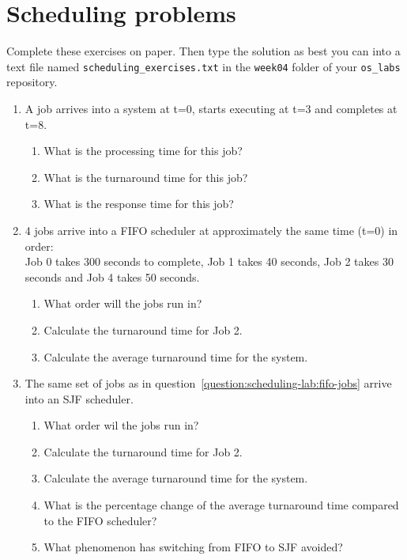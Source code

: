 \chapter{Scheduling problems}
\label{ch:scheduling-problems}

Complete these exercises on paper.
Then type the solution as best you can into a text file named \texttt{scheduling\_exercises.txt} in the \texttt{week04} folder of your \texttt{os\_labs} repository.

\begin{enumerate}

\item 
  A job arrives into a system at t=0, starts executing at t=3 and completes at t=8.
  \begin{enumerate}
  \item What is the processing time for this job?
  \item What is the turnaround time for this job?
  \item What is the response time for this job?
  \end{enumerate}

\item \label{question:scheduling-lab:fifo-jobs}
  4 jobs arrive into a FIFO scheduler at approximately the same time (t=0) in order:\\
  Job 0 takes 300 seconds to complete, Job 1 takes 40 seconds, Job 2 takes 30 seconds and Job 4 takes 50 seconds.
  \begin{enumerate}
  \item What order will the jobs run in?
  \item Calculate the turnaround time for Job 2.
  \item Calculate the average turnaround time for the system.
  \end{enumerate}
  
\item
  The same set of jobs as in question~\ref{question:scheduling-lab:fifo-jobs} arrive into an SJF scheduler.
  \begin{enumerate}
  \item What order wil the jobs run in?
  \item Calculate the turnaround time for Job 2.
  \item Calculate the average turnaround time for the system.
  \item What is the percentage change of the average turnaround time compared to the FIFO scheduler?
  \item What phenomenon has switching from FIFO to SJF avoided?
  \end{enumerate}


\end{enumerate}
